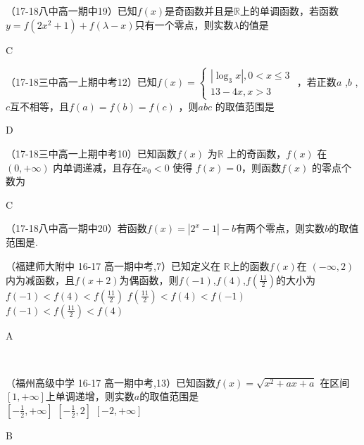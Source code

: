 \item
（17-18八中高一期中19）已知$f(x)$是奇函数并且是$\mathbb{R}$上的单调函数，若函数$y=f(2x^2+1)+f(\lambda-x) $只有一个零点，则实数$\lambda $的值是\xz
{}
\begin{answers}
C
\end{answers}

\item
（17-18三中高一上期中考12）已知$f(x)=\begin{cases}
 |\log_3x|,0<x\leq3\\13-4x,x>3   
\end{cases} $ ，若正数$a$ ,$b$ , $c$互不相等，且$f(a)=f(b)=f(c)$ ，则$abc$ 的取值范围是\xz
{}
\begin{answers}
D
\end{answers}

\item
（17-18三中高一上期中考10）已知函数$f(x)$ 为$\mathbb{R}$ 上的奇函数，$f(x)$ 在$(0,+\infty)$ 内单调递减，且存在$x_0<0$ 使得 $f(x)=0$，则函数$f(x)$ 的零点个数为\xz\\
\begin{answers}
C
\end{answers}
\item
（17-18八中高一期中20）若函数$f(x)=|2^x-1|-b $有两个零点，则实数$b$的取值范围是\tk.\\


\item（福建师大附中 16-17 高一期中考,7）已知定义在 $\mathbb{R}$上的函数$f(x)$在 $(-\infty,2)$内为减函数，且$f(x+2) $为偶函数，则$f(-1)$,$f(4)$,$f(\frac{11}2 )$的大小为\xz \\
	   {$f(-1)<f(4)<f(\frac{11}2 )$}
       {$f(\frac{11}2 )<f(4)<f(-1)$}
       {$f(-1)<f(\frac{11}2 )<f(4)$}
\begin{answer}A\end{answer}\\
     
\item
（福州高级中学 16-17 高一期中考,13）已知函数$f(x)=\sqrt{x^2+ax+a} $ 在区间$[1,+\infty] $上单调递增，则实数$a$的取值范围是\xz\\
\xx{$[-2,-\frac12]$}
		{$[-\frac12,+\infty] $}
        {$[-\frac12,2] $}
        {$[-2,+\infty] $}
\begin{answer}B\end{answer}

